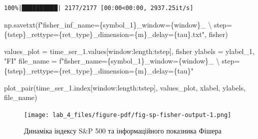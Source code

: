 \documentclass[
  letterpaper,
]{report}
\newenvironment{Shaded}{\begin{snugshade}}{\end{snugshade}}
\newcommand{\CharTok}[1]{\textcolor[rgb]{0.13,0.47,0.30}{#1}}
\newcommand{\NormalTok}[1]{\textcolor[rgb]{0.00,0.23,0.31}{#1}}
\newcommand{\OperatorTok}[1]{\textcolor[rgb]{0.37,0.37,0.37}{#1}}
\newcommand{\SpecialCharTok}[1]{\textcolor[rgb]{0.37,0.37,0.37}{#1}}
\newcommand{\SpecialStringTok}[1]{\textcolor[rgb]{0.13,0.47,0.30}{#1}}
\newcommand{\StringTok}[1]{\textcolor[rgb]{0.13,0.47,0.30}{#1}}
\begin{document}
\begin{verbatim}
100%|██████████| 2177/2177 [00:00<00:00, 2937.25it/s]
\end{verbatim}

\begin{Shaded}
\begin{Highlighting}[]
\NormalTok{np.savetxt(}\SpecialStringTok{f"fisher\_inf\_name=}\SpecialCharTok{\{}\NormalTok{symbol\_1}\SpecialCharTok{\}}\SpecialStringTok{\_window=}\SpecialCharTok{\{}\NormalTok{window}\SpecialCharTok{\}}\SpecialStringTok{\_ }\CharTok{\textbackslash{}}
\SpecialStringTok{    step=}\SpecialCharTok{\{}\NormalTok{tstep}\SpecialCharTok{\}}\SpecialStringTok{\_rettype=}\SpecialCharTok{\{}\NormalTok{ret\_type}\SpecialCharTok{\}}\SpecialStringTok{\_dimension=}\SpecialCharTok{\{}\NormalTok{m}\SpecialCharTok{\}}\SpecialStringTok{\_delay=}\SpecialCharTok{\{}\NormalTok{tau}\SpecialCharTok{\}}\SpecialStringTok{.txt"}\NormalTok{, fisher)}
\end{Highlighting}
\end{Shaded}

\begin{Shaded}
\begin{Highlighting}[]
\NormalTok{values\_plot }\OperatorTok{=}\NormalTok{ time\_ser\_1.values[window:length:tstep], fisher}
\NormalTok{ylabels }\OperatorTok{=}\NormalTok{ ylabel\_1, }\StringTok{"FI"}
\NormalTok{file\_name }\OperatorTok{=} \SpecialStringTok{f"fisher\_name=}\SpecialCharTok{\{}\NormalTok{symbol\_1}\SpecialCharTok{\}}\SpecialStringTok{\_window=}\SpecialCharTok{\{}\NormalTok{window}\SpecialCharTok{\}}\SpecialStringTok{\_ }\CharTok{\textbackslash{}}
\SpecialStringTok{    step=}\SpecialCharTok{\{}\NormalTok{tstep}\SpecialCharTok{\}}\SpecialStringTok{\_rettype=}\SpecialCharTok{\{}\NormalTok{ret\_type}\SpecialCharTok{\}}\SpecialStringTok{\_dimension=}\SpecialCharTok{\{}\NormalTok{m}\SpecialCharTok{\}}\SpecialStringTok{\_delay=}\SpecialCharTok{\{}\NormalTok{tau}\SpecialCharTok{\}}\SpecialStringTok{"}
\end{Highlighting}
\end{Shaded}

\begin{Shaded}
\begin{Highlighting}[]
\NormalTok{plot\_pair(time\_ser\_1.index[window:length:tstep], values\_plot, xlabel, ylabels, file\_name)}
\end{Highlighting}
\end{Shaded}

\begin{figure}[H]

{\centering \texttt{[image: lab\_4\_files/figure-pdf/fig-sp-fisher-output-1.png]}

}

\caption{\label{fig-sp-fisher}Динаміка індексу S\&P 500 та
інформаційного показника Фішера}

\end{figure}
\end{document}
